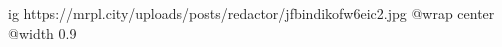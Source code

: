  
 
 
 
 

\ifcmt
  ig https://mrpl.city/uploads/posts/redactor/jfbindikofw6eic2.jpg
  @wrap center
  @width 0.9
\fi
